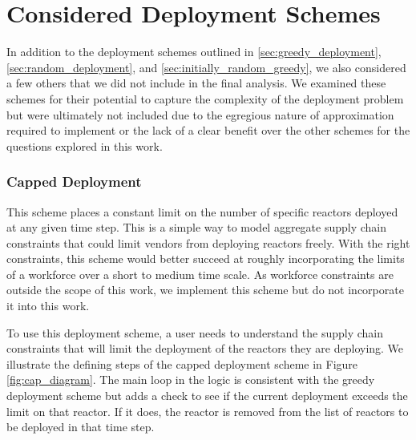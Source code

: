 \chapter{Considered Deployment Schemes}
\label{sec:considered_deployment_schemes}
In addition to the deployment schemes outlined in \ref{sec:greedy_deployment},
\ref{sec:random_deployment}, and \ref{sec:initially_random_greedy}, we also
considered a few others that we did not include in the final analysis. We
examined these schemes for their potential to capture the complexity of the
deployment problem but were ultimately not included due to the egregious nature
of approximation required to implement or the lack of a clear benefit over the
other schemes for the questions explored in this work.

\subsection{Capped Deployment}
\label{sec:capped_deployment}
This scheme places a constant limit on the number of specific reactors deployed
at any given time step. This is a simple way to model aggregate supply chain
constraints that could limit vendors from deploying reactors freely. With the
right constraints, this scheme would better succeed at roughly incorporating
the limits of a workforce over a short to medium time scale. As workforce
constraints are outside the scope of this work, we implement this scheme but do
not incorporate it into this work.

To use this deployment scheme, a user needs to understand the supply chain
constraints that will limit the deployment of the reactors they are deploying.
We illustrate the defining steps of the capped deployment scheme in Figure
\ref{fig:cap_diagram}. The main loop in the logic is consistent with the greedy
deployment scheme but adds a check to see if the current deployment exceeds the
limit on that reactor. If it does, the reactor is removed from the list of
reactors to be deployed in that time step.

